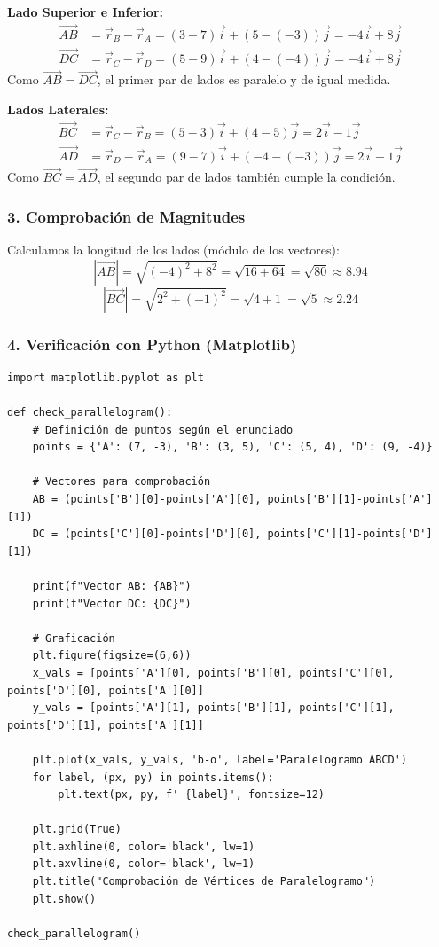 \documentclass[12pt, a4paper]{article}
\begin{document}
\textbf{Lado Superior e Inferior:}
\begin{align*}
    \vec{AB} &= \vec{r}_B - \vec{r}_A = (3 - 7)\vec{i} + (5 - (-3))\vec{j} = -4\vec{i} + 8\vec{j} \\
    \vec{DC} &= \vec{r}_C - \vec{r}_D = (5 - 9)\vec{i} + (4 - (-4))\vec{j} = -4\vec{i} + 8\vec{j}
\end{align*}
Como $\vec{AB} = \vec{DC}$, el primer par de lados es paralelo y de igual medida.

\textbf{Lados Laterales:}
\begin{align*}
    \vec{BC} &= \vec{r}_C - \vec{r}_B = (5 - 3)\vec{i} + (4 - 5)\vec{j} = 2\vec{i} - 1\vec{j} \\
    \vec{AD} &= \vec{r}_D - \vec{r}_A = (9 - 7)\vec{i} + (-4 - (-3))\vec{j} = 2\vec{i} - 1\vec{j}
\end{align*}
Como $\vec{BC} = \vec{AD}$, el segundo par de lados también cumple la condición.

\subsubsection*{3. Comprobación de Magnitudes}
Calculamos la longitud de los lados (módulo de los vectores):
$$ |\vec{AB}| = \sqrt{(-4)^2 + 8^2} = \sqrt{16 + 64} = \sqrt{80} \approx 8.94 $$
$$ |\vec{BC}| = \sqrt{2^2 + (-1)^2} = \sqrt{4 + 1} = \sqrt{5} \approx 2.24 $$

\subsubsection*{4. Verificación con Python (Matplotlib)}
\begin{lstlisting}
import matplotlib.pyplot as plt

def check_parallelogram():
    # Definición de puntos según el enunciado
    points = {'A': (7, -3), 'B': (3, 5), 'C': (5, 4), 'D': (9, -4)}
    
    # Vectores para comprobación
    AB = (points['B'][0]-points['A'][0], points['B'][1]-points['A'][1])
    DC = (points['C'][0]-points['D'][0], points['C'][1]-points['D'][1])
    
    print(f"Vector AB: {AB}")
    print(f"Vector DC: {DC}")
    
    # Graficación
    plt.figure(figsize=(6,6))
    x_vals = [points['A'][0], points['B'][0], points['C'][0], points['D'][0], points['A'][0]]
    y_vals = [points['A'][1], points['B'][1], points['C'][1], points['D'][1], points['A'][1]]
    
    plt.plot(x_vals, y_vals, 'b-o', label='Paralelogramo ABCD')
    for label, (px, py) in points.items():
        plt.text(px, py, f' {label}', fontsize=12)
        
    plt.grid(True)
    plt.axhline(0, color='black', lw=1)
    plt.axvline(0, color='black', lw=1)
    plt.title("Comprobación de Vértices de Paralelogramo")
    plt.show()

check_parallelogram()
\end{lstlisting}
\end{document}
